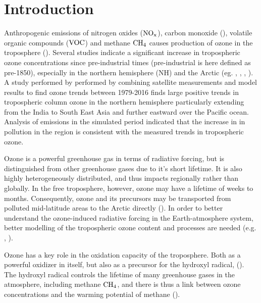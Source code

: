 \chapter{Introduction} \label{ch:introduction}
Anthropogenic emissions of nitrogen oxides ($\mathrm{NO_x}$), carbon monoxide (), volatile organic compounds ($\mathrm{VOC}$) and methane $\mathrm{CH_4}$ causes production of ozone in the troposphere (\cite{SeinfeldSpyros}). Several studies indicate a significant increase in tropospheric ozone concentrations since pre-industrial times (pre-industrial is here defined as pre-1850), especially in the northern hemisphere (NH) and the Arctic (eg. \cite{WangJacob1998}, \cite{Shindell2007}, \cite{Parrish2014}, \cite{AMAP2015}). A study performed by \cite{ZIEMKE2019} performed by combining satellite measurements and model results to find ozone trends between 1979-2016 finds large positive trends in tropospheric column ozone in the northern hemisphere particularly extending from the India to South East Asia and further eastward over the Pacific ocean. Analysis of  emissions in the simulated period indicated that the increase in in pollution in the region is consistent with the measured trends in tropospheric ozone.  

\medskip

Ozone is a powerful greenhouse gas in terms of radiative forcing, but is distinguished from other greenhouse gases due to it's short lifetime. It is also highly heterogeneously distributed, and thus impacts regionally rather than globally. In the free troposphere, however, ozone may have a lifetime of weeks to months. Consequently, ozone and its precursors may be transported from polluted mid-latitude areas to the Arctic directly (\cite{AMAP2015}). In order to better understand the ozone-induced radiative forcing in the Earth-atmosphere system, better modelling of the tropospheric ozone content and processes are needed (e.g. \cite{Bowman2013}, \cite{Parella}). 

\medskip

Ozone has a key role in the oxidation capacity of the troposphere. Both as a powerful oxidizer in itself, but also as a precursor for the hydroxyl radical,  (\cite{WangJacob1998}). The hydroxyl radical controls the lifetime of many greenhouse gases in the atmosphere, including methane $\mathrm{CH_4}$, and there is thus a link between ozone concentrations and the warming potential of methane (\cite{Levy1971}). 

\medskip

